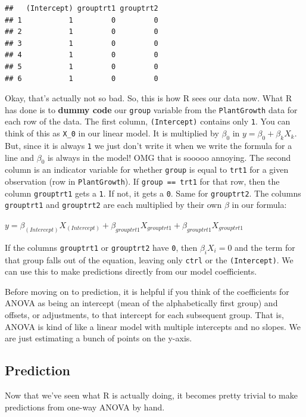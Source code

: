 \documentclass[
]{book}
\begin{document}
\begin{verbatim}
##   (Intercept) grouptrt1 grouptrt2
## 1           1         0         0
## 2           1         0         0
## 3           1         0         0
## 4           1         0         0
## 5           1         0         0
## 6           1         0         0
\end{verbatim}

Okay, that's actually not so bad. So, this is how R sees our data now. What R has done is to \textbf{dummy code} our \texttt{group} variable from the \texttt{PlantGrowth} data for each row of the data. The first column, \texttt{(Intercept)} contains only \texttt{1}. You can think of this as \texttt{X\_0} in our linear model. It is multiplied by \(\beta_0\) in \(y = \beta_0 + \beta_k X_k\). But, since it is always \texttt{1} we just don't write it when we write the formula for a line and \(\beta_0\) is always in the model! OMG that is sooooo annoying. The second column is an indicator variable for whether \texttt{group} is equal to \texttt{trt1} for a given observation (row in \texttt{PlantGrowth}). If \texttt{group\ ==\ trt1} for that row, then the column \texttt{grouptrt1} gets a \texttt{1}. If not, it gets a \texttt{0}. Same for \texttt{grouptrt2}. The columns \texttt{grouptrt1} and \texttt{grouptrt2} are each multiplied by their own \(\beta\) in our formula:

\(y = \beta_{(Intercept)} X_{(Intercept)} + \beta_{grouptrt1} X_{grouptrt1} + \beta_{grouptrt1} X_{grouptrt1}\)

If the columns \texttt{grouptrt1} or \texttt{grouptrt2} have \texttt{0}, then \(\beta_i X_i = 0\) and the term for that group falls out of the equation, leaving only \texttt{ctrl} or the \texttt{(Intercept)}. We can use this to make predictions directly from our model coefficients.

Before moving on to prediction, it is helpful if you think of the coefficients for ANOVA as being an intercept (mean of the alphabetically first group) and offsets, or adjustments, to that intercept for each subsequent group. That is, ANOVA is kind of like a linear model with multiple intercepts and no slopes. We are just estimating a bunch of points on the y-axis.

\hypertarget{prediction}{%
\subsection{Prediction}\label{prediction}}

Now that we've seen what R is actually doing, it becomes pretty trivial to make predictions from one-way ANOVA by hand.
\end{document}
